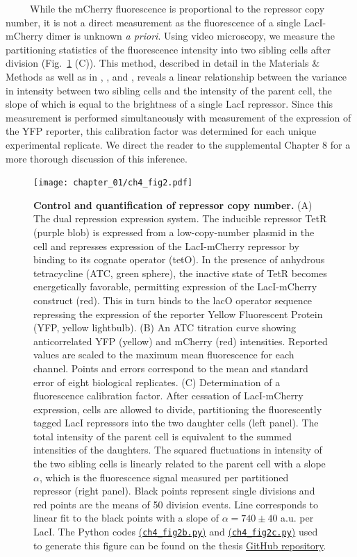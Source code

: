 \documentclass[12pt]{caltech_thesis}
\begin{document}
~~~~~While the mCherry fluorescence is proportional to the repressor
copy number, it is not a direct measurement as the fluorescence of a
single LacI-mCherry dimer is unknown \emph{a priori}. Using video
microscopy, we measure the partitioning statistics of the fluorescence
intensity into two sibling cells after division
(Fig.~\ref{fig:dilution_circuit} (C)). This method, described in detail
in the Materials \& Methods as well as in \textcite{rosenfeld2002},
\textcite{rosenfeld2005}, and \textcite{brewster2014}, reveals a linear
relationship between the variance in intensity between two sibling cells
and the intensity of the parent cell, the slope of which is equal to the
brightness of a single LacI repressor. Since this measurement is
performed simultaneously with measurement of the expression of the YFP
reporter, this calibration factor was determined for each unique
experimental replicate. We direct the reader to the supplemental Chapter
8 for a more thorough discussion of this inference.

\hypertarget{fig:dilution_circuit}{%
\begin{figure}
\centering
\texttt{[image: chapter\_01/ch4\_fig2.pdf]}
\caption[{Control and quantification of repressor copy number through
the binomial partitioning method.}]{\textbf{Control and quantification
of repressor copy number.} (A) The dual repression expression system.
The inducible repressor TetR (purple blob) is expressed from a
low-copy-number plasmid in the cell and represses expression of the
LacI-mCherry repressor by binding to its cognate operator (tetO). In the
presence of anhydrous tetracycline (ATC, green sphere), the inactive
state of TetR becomes energetically favorable, permitting expression of
the LacI-mCherry construct (red). This in turn binds to the lacO
operator sequence repressing the expression of the reporter Yellow
Fluorescent Protein (YFP, yellow lightbulb). (B) An ATC titration curve
showing anticorrelated YFP (yellow) and mCherry (red) intensities.
Reported values are scaled to the maximum mean fluorescence for each
channel. Points and errors correspond to the mean and standard error of
eight biological replicates. (C) Determination of a fluorescence
calibration factor. After cessation of LacI-mCherry expression, cells
are allowed to divide, partitioning the fluorescently tagged LacI
repressors into the two daughter cells (left panel). The total intensity
of the parent cell is equivalent to the summed intensities of the
daughters. The squared fluctuations in intensity of the two sibling
cells is linearly related to the parent cell with a slope \(\alpha\),
which is the fluorescence signal measured per partitioned repressor
(right panel). Black points represent single divisions and red points
are the means of 50 division events. Line corresponds to linear fit to
the black points with a slope of \(\alpha = 740 \pm 40\) a.u. per LacI.
The Python codes
\href{https://github.com/gchure/phd/blob/master/src/chapter_04/code/ch4_fig2b.py}{(\texttt{ch4\_fig2b.py})}
and
\href{https://github.com/gchure/phd/blob/master/src/chapter_04/code/ch4_fig2c.py}{(\texttt{ch4\_fig2c.py})}
used to generate this figure can be found on the thesis
\href{https://github.com/gchure/phd}{GitHub repository}.}
\label{fig:dilution_circuit}
\end{figure}
}
\end{document}
